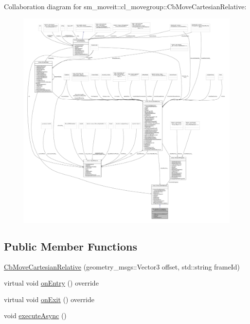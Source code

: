 Collaboration diagram for sm\+\_\+moveit\+:\+:cl\+\_\+movegroup\+:\+:Cb\+Move\+Cartesian\+Relative\+:
\nopagebreak
\begin{figure}[H]
\begin{center}
\leavevmode
\includegraphics[width=350pt]{classsm__moveit_1_1cl__movegroup_1_1CbMoveCartesianRelative__coll__graph}
\end{center}
\end{figure}
\subsection*{Public Member Functions}
\begin{DoxyCompactItemize}
\item 
\hyperlink{classsm__moveit_1_1cl__movegroup_1_1CbMoveCartesianRelative_a4f5ec47d34d740a65592864a70978e35}{Cb\+Move\+Cartesian\+Relative} (geometry\+\_\+msgs\+::\+Vector3 offset, std\+::string frame\+Id)
\item 
virtual void \hyperlink{classsm__moveit_1_1cl__movegroup_1_1CbMoveCartesianRelative_ad28332aaa1952bc1e359c79aa961108e}{on\+Entry} () override
\item 
virtual void \hyperlink{classsm__moveit_1_1cl__movegroup_1_1CbMoveCartesianRelative_a2ef22fcd4fd348d8dbee9560c5edb790}{on\+Exit} () override
\item 
void \hyperlink{classsm__moveit_1_1cl__movegroup_1_1CbMoveCartesianRelative_a53410592d5745c5ebff8e09f9c3f48e1}{execute\+Async} ()
\end{DoxyCompactItemize}



